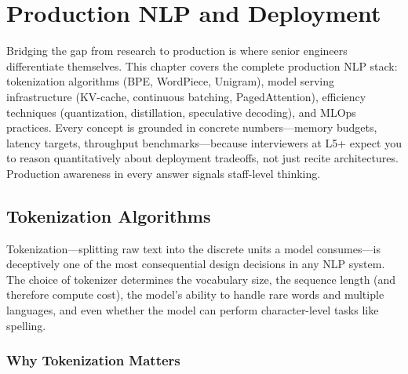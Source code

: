 
\chapter{Production NLP and Deployment}
\label{chap:production_nlp}

\begin{tldr}
Bridging the gap from research to production is where senior engineers differentiate
themselves.  This chapter covers the complete production NLP stack: tokenization algorithms
(BPE, WordPiece, Unigram), model serving infrastructure (KV-cache, continuous batching,
PagedAttention), efficiency techniques (quantization, distillation, speculative decoding),
and MLOps practices.  Every concept is grounded in concrete numbers---memory budgets,
latency targets, throughput benchmarks---because interviewers at L5+ expect you to reason
quantitatively about deployment tradeoffs, not just recite architectures.  Production
awareness in every answer signals staff-level thinking.
\end{tldr}

\bigskip

\section{Tokenization Algorithms}
\label{sec:tokenization_algorithms}

Tokenization---splitting raw text into the discrete units a model consumes---is deceptively
one of the most consequential design decisions in any NLP system.  The choice of tokenizer
determines the vocabulary size, the sequence length (and therefore compute cost), the model's
ability to handle rare words and multiple languages, and even whether the model can perform
character-level tasks like spelling.

\subsection{Why Tokenization Matters}

